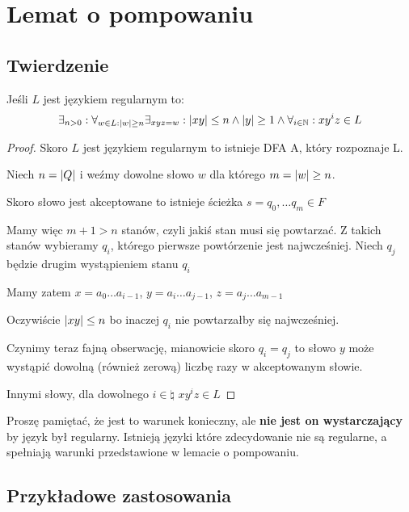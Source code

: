 \section{Lemat o pompowaniu}

\subsection{Twierdzenie}

\begin{lemma}[O pompowaniu]
	Jeśli \( L \) jest językiem regularnym to:
	\[
		\exists_{n > 0} : \forall_{w \in L : \left\lvert w\right\rvert \geq n} \exists_{xyz = w} : \left\lvert xy\right\rvert \leq n \land \left\lvert y\right\rvert \geq 1 \land \forall_{i \in \mathbb{N}} : xy^iz \in L
	\]
\end{lemma}
\begin{proof}
	Skoro \( L \) jest językiem regularnym to istnieje DFA A, który rozpoznaje L.

	Niech \( n = \left\lvert Q\right\rvert \) i weźmy dowolne słowo \( w \) dla którego \( m = \left\lvert w\right\rvert \geq n \).

	Skoro słowo jest akceptowane to istnieje ścieżka \( s = q_0, \dots q_m \in F \)

	Mamy więc \( m + 1 > n \) stanów, czyli jakiś stan musi się powtarzać.
	Z takich stanów wybieramy \( q_i \), którego pierwsze powtórzenie jest najwcześniej. Niech \( q_j \) będzie drugim wystąpieniem stanu \( q_i \)

	Mamy zatem \( x = a_0\dots a_{i-1} \), \( y = a_i\dots a_{j-1} \), \( z = a_j \dots a_{m-1} \)

	Oczywiście \( \left\lvert xy\right\rvert \leq n \) bo inaczej \( q_i \) nie powtarzałby się najwcześniej.

	Czynimy teraz fajną obserwację, mianowicie skoro  \( q_i = q_j \) to słowo \( y \) może wystąpić dowolną (również zerową) liczbę razy w akceptowanym słowie.

	Innymi słowy, dla dowolnego \( i \in \natural \) \( xy^iz \in L \)
\end{proof}

Proszę pamiętać, że jest to warunek konieczny, ale \textbf{nie jest on wystarczający} by język był regularny. Istnieją języki które zdecydowanie nie są regularne, a spełniają warunki przedstawione w lemacie o pompowaniu.

\subsection{Przykładowe zastosowania}

